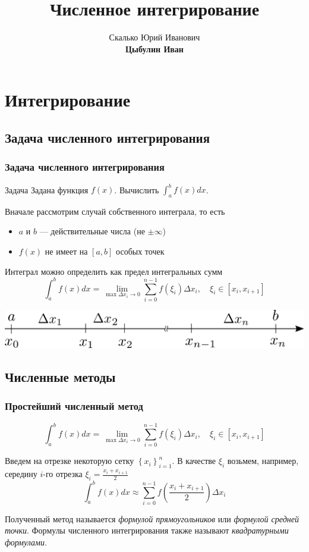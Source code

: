\documentclass[apectratio=43,unicode]{beamer}
\title[Интегрирование]{Численное интегрирование}
\author[Цыбулин Иван]{Скалько Юрий Иванович\\
\textbf{Цыбулин Иван}}
\date{}
\begin{document}
\begin{frame}[plain]
\titlepage
\end{frame}

\section{Интегрирование}
\subsection{Задача численного интегрирования}
\begin{frame}
\frametitle{Задача численного интегрирования}
	\begin{block}{Задача}
		Задана функция $f(x)$. Вычислить $\displaystyle\int_a^b f(x) dx$.
	\end{block}
	\pause

	Вначале рассмотрим случай собственного интеграла, то есть
	\begin{itemize}
		\item $a$ и $b$ --- действительные числа (не $\pm \infty$)
		\item $f(x)$ не имеет на $[a,b]$ особых точек
	\end{itemize}
	\pause

	Интеграл можно определить как предел интегральных сумм
	\[
	\int_a^b f(x) dx = \lim_{\max \Delta x_i \rightarrow 0} \sum_{i=0}^{n-1}
f(\xi_i) \Delta x_i,\quad \xi_i \in [x_i,x_{i+1}]
	\]

	\includegraphics[width=\textwidth]{grid.png}
\end{frame}

\subsection{Численные методы}
\begin{frame}
\frametitle{Простейший численный метод}
	\[
	\int_a^b f(x) dx = \lim_{\max \Delta x_i \rightarrow 0} \sum_{i=0}^{n-1} f(\xi_i) \Delta x_i,\quad \xi_i \in [x_i,x_{i+1}]
	\]

	Введем на отрезке некоторую сетку $\left\{x_i\right\}_{i = 1}^n$. В качестве $\xi_i$ возьмем, например, середину $i$-го отрезка
	$ \xi_i = \frac{x_i+x_{i+1}}{2} $
	\pause
	\[
	\int_a^b f(x) dx \approx \sum_{i=0}^{n-1} f\left(\frac{x_i+x_{i+1}}{2}\right)\Delta x_i
	\]
	\pause

	Полученный метод называется \emph{формулой прямоугольников} или
	\emph{формулой средней точки}. Формулы численного интегрирования также
	называют \emph{квадратурными формулами}.
\end{frame}
\end{document}
